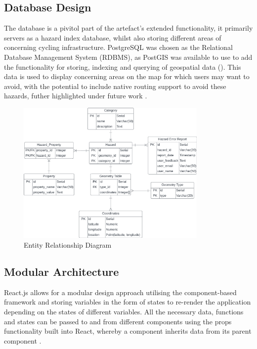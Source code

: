 \subsection{Database Design}
\label{system:database-design}

The database is a pivitol part of the artefact's extended functionality, it primarily servers as a hazard index database, whilst also storing different areas of concerning cycling infrastructure. PostgreSQL was chosen as the Relational Database Management System (RDBMS), as PostGIS was available to use to add the functionality for storing, indexing and querying of geospatial data (\cite{noauthor_postgis_nodate}). This data is used to display concerning areas on the map for which users may want to avoid, with the potential to include native routing support to avoid these hazards, futher highlighted under future work  . 

\begin{figure}[!ht]
  \centering
  \includegraphics[width=350px]{figures/erd.png}
  \caption{Entity Relationship Diagram}
  \label{fig:erd}
\end{figure}

\subsection{Modular Architecture}
\label{system:modular-architecture}
React.js allows for a modular design approach utilising the component-based framework and storing variables in the form of states to re-render the application depending on the states of different variables. All the necessary data, functions and states can be passed to and from different components using the props functionality built into React, whereby a component inherits data from its parent component .

